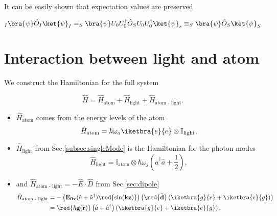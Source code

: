 It can be easily shown that expectation values are preserved

\begin{equation}
_I\bra{\psi}\hat{O}_I\ket{\psi}_I = _S\bra{\psi}U_0U_0^\dagger\hat{O}_SU_0U_0^\dagger\ket{\psi}_s \equiv _S\bra{\psi}\hat{O}_S\ket{\psi}_S
\end{equation}

\newpage 
\section{Interaction between light and atom \label{sec:lightAtom}}
We construct the Hamiltonian for the full system

\begin{equation}
\hat{H} = \hat{H}_\text{atom} + \hat{H}_\text{light} + \hat{H}_\text{atom - light}. 
\end{equation}

\begin{itemize}
	\item $\hat{H}_\text{atom}$ comes from the energy levels of the atom
	\begin{equation}
	\label{eqn:atomHamiltonian}
	\hat{H}_\text{atom} = \hbar\omega_a\iketbra{e}{e}\otimes\mathbb{I}_\text{light},
	\end{equation}
	
	\item $\hat{H}_\text{light}$ from Sec.\ref{subsec:singleMode} is the Hamiltonian for the photon modes
	\begin{equation}
	\label{eqn:lightHamiltonian}
	\hat{H}_\text{light} = \mathbb{I}_\text{atom} \otimes \hbar\omega_j\left(\hat{a}^\dagger\hat{a}+\frac{1}{2}\right),
	\end{equation}
	
	\item and $\hat{H}_\text{atom - light} = - \hat{E}\cdot \hat{D} $ from Sec.\ref{sec:dipole}
	\begin{equation}
	\begin{aligned}
	\hat{H}_\text{atom - light} & = - \left(\mathbf{E_{0x}}(\hat{a}+\hat{a}^\dagger)\mathbf{\red{\sin(kz)}}\right)\left(\red{\mathbf{\vec{d}}}\left(\iketbra{g}{e}+\iketbra{e}{g}\right)\right)\\
	& = \mathbf{\red{\hbar g(\vec{r})}}\left(\hat{a}+\hat{a}^\dagger\right)\left(\iketbra{g}{e}+\iketbra{e}{g}\right),
	\end{aligned}
	\end{equation}	
\end{itemize}  

